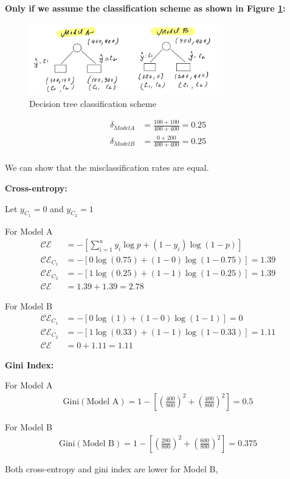 \textbf{Only if we assume the classification scheme as shown in Figure \ref{fig:problem_2}:}

\begin{figure}[!ht]
	\centering
	\includegraphics[width=0.75\textwidth]{images/problem_2.jpeg}
	\caption{Decision tree classification scheme}
	\label{fig:problem_2}	
\end{figure}

\begin{align*}
	\delta_{Model A} & = \frac{100 + 100}{400 + 400} = 0.25 \\
	\delta_{Model B} & = \frac{0 + 200}{400 + 400} = 0.25 \\
\end{align*}

We can show that the misclassification rates are equal.
	
\textbf{Cross-entropy:}

Let $y_{C_{1}} = 0$ and $y_{C_{2}} = 1$

For Model A
\begin{align*}
	\mathcal{CE} & = - [ \sum_{i=1}^{n} y_{i} \log p + (1 - y_{i}) \log (1 - p) ] \\
	\mathcal{CE}_{C_{1}} & = - [ 0 \log (0.75) + (1 - 0) \log (1 - 0.75) ] = 1.39 \\
	\mathcal{CE}_{C_{2}} & = - [ 1 \log (0.25) + (1 - 1) \log (1 - 0.25) ] = 1.39 \\	
	\mathcal{CE} & = 1.39 + 1.39 = 2.78
\end{align*}


For Model B
\begin{align*}
	\mathcal{CE}_{C_{1}} & = - [ 0 \log (1) + (1 - 0) \log (1 - 1) ] = 0 \\
	\mathcal{CE}_{C_{2}} & = - [ 1 \log (0.33) + (1 - 1) \log (1 - 0.33) ] = 1.11 \\	
	\mathcal{CE} & = 0 + 1.11 = 1.11
\end{align*}

\textbf{Gini Index:}

For Model A
\begin{align*}
	\text{Gini}(\text{Model A}) = 1 - \left[ \left( \frac{400}{800} \right)^{2} + \left( \frac{400}{800} \right)^{2}  \right] = 0.5
\end{align*}

For Model B
\begin{align*}
	\text{Gini}(\text{Model B}) = 1 - \left[ \left( \frac{200}{800} \right)^{2} + \left( \frac{600}{800} \right)^{2} \right] = 0.375
\end{align*}

Both cross-entropy and gini index are lower for Model B,

